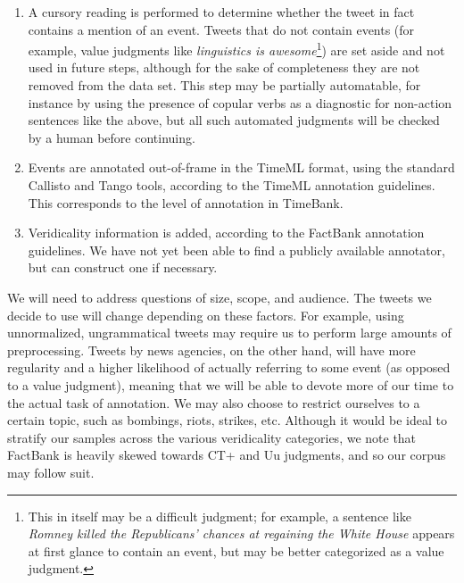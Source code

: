 \documentclass[11pt,letterpaper]{article}
\begin{document}
\begin{enumerate}
\item
A cursory reading is performed to determine whether the tweet in fact
contains a mention of an event.
Tweets that do not contain events (for example, value judgments like
\textit{linguistics is awesome}\footnote{This in itself may be a
difficult judgment; for example, a sentence like \textit{Romney killed
the Republicans' chances at regaining the White House} appears at first
glance to contain an event, but may be better categorized as a value
judgment.}) are set aside and not used in future steps, although for the
sake of completeness they are not removed from the data set.
This step may be partially automatable, for instance by using the
presence of copular verbs as a diagnostic for non-action sentences like
the above, but all such automated judgments will be checked by a human
before continuing.

\item
Events are annotated out-of-frame in the TimeML format, using the
standard Callisto and Tango tools, according to the TimeML annotation
guidelines.
This corresponds to the level of annotation in TimeBank.

\item
Veridicality information is added, according to the FactBank annotation
guidelines.
We have not yet been able to find a publicly available annotator, but
can construct one if necessary.
\end{enumerate}

We will need to address questions of size, scope, and audience.
The tweets we decide to use will change depending on these factors.
For example, using unnormalized, ungrammatical tweets may require us to
perform large amounts of preprocessing.
Tweets by news agencies, on the other hand, will have more regularity
and a higher likelihood of actually referring to some event (as opposed
to a value judgment), meaning that we will be able to devote more of our
time to the actual task of annotation.
We may also choose to restrict ourselves to a certain topic, such as
bombings, riots, strikes, etc.
Although it would be ideal to stratify our samples across the various
veridicality categories, we note that FactBank is heavily skewed towards
CT+ and Uu judgments, and so our corpus may follow suit.




\end{document}
